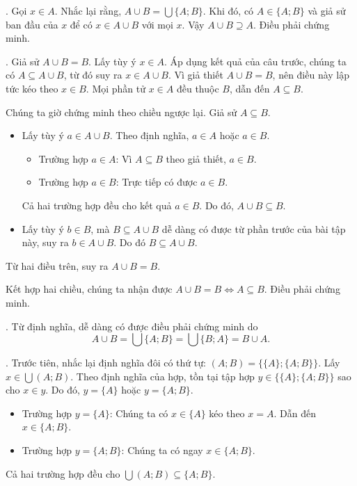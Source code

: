 . Gọi $x \in A$. Nhắc lại rằng, $A \cup B = \bigcup \{A; B\}$. Khi đó, có $A \in \{A; B\}$ và giả sử ban đầu của $x$ để có $x \in A \cup B$ với mọi $x$. Vậy $A \cup B \supseteq A$. Điều phải chứng minh.

. Giả sử $A \cup B = B$. Lấy tùy ý $x \in A$. Áp dụng kết quả của câu trước, chúng ta có $A \subseteq A \cup B$, từ đó suy ra $x \in A \cup B$. Vì giả thiết $A \cup B = B$, nên điều này lập tức kéo theo $x \in B$. Mọi phần tử $x \in A$ đều thuộc $B$, dẫn đến $A \subseteq B$.

Chúng ta giờ chứng minh theo chiều ngược lại. Giả sử $A \subseteq B$.
\begin{itemize}
   \item Lấy tùy ý $a \in A \cup B$. Theo định nghĩa, $a \in A$ hoặc $a \in B$.
         \begin{itemize}
            \item \textcolor{colorEmphasis}{Trường hợp $a \in A$}: Vì $A \subseteq B$ theo giả thiết, $a \in B$.
            \item \textcolor{colorEmphasisCyan}{Trường hợp $a \in B$}: Trực tiếp có được $a \in B$.
         \end{itemize}
         Cả hai trường hợp đều cho kết quả $a \in B$. Do đó, $A \cup B \subseteq B$.
   \item Lấy tùy ý $b \in B$, mà $B \subseteq A \cup B$ dễ dàng có được từ phần trước của bài tập này, suy ra $b \in A \cup B$. Do đó $B \subseteq A \cup B$.
\end{itemize}
Từ hai điều trên, suy ra $A \cup B = B$.

Kết hợp hai chiều, chúng ta nhận được $A \cup B = B \iff A \subseteq B$. Điều phải chứng minh.

. Từ định nghĩa, dễ dàng có được điều phải chứng minh do
$$ A \cup B = \bigcup \{A; B\} = \bigcup \{B; A\} = B \cup A.$$

. Trước tiên, nhắc lại định nghĩa đôi có thứ tự: $(A; B) = \big\{ \{A\}; \{A; B\} \big\}$. Lấy $x \in \bigcup (A; B)$. Theo định nghĩa của hợp, tồn tại tập hợp $y \in \big\{ \{A\}; \{A; B\} \big\}$ sao cho $x \in y$. Do đó, $y = \{A\}$ hoặc $y = \{A; B\}$.
\begin{itemize}
   \item \textcolor{colorEmphasis}{Trường hợp $y = \{A\}$}: Chúng ta có $x \in \{A\}$ kéo theo $x = A$. Dẫn đến $x \in \{A; B\}$.
   \item \textcolor{colorEmphasisCyan}{Trường hợp $y = \{A; B\}$}: Chúng ta có ngay $x \in \{A; B\}$.
\end{itemize}
Cả hai trường hợp đều cho $\bigcup (A; B) \subseteq \{A; B\}$.

